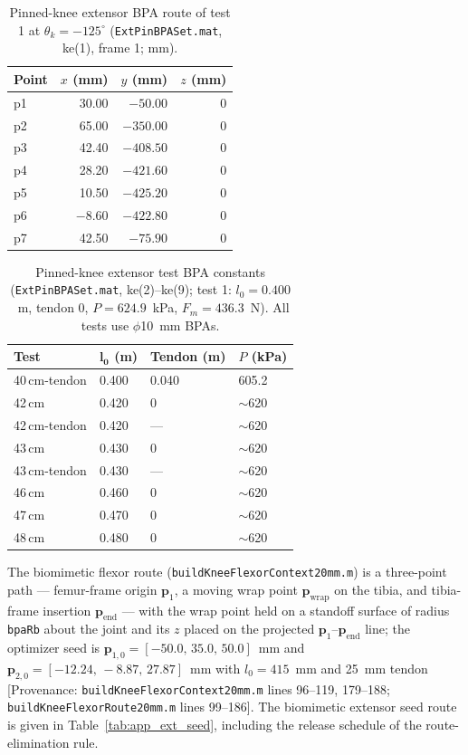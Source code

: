 \begin{table}[htbp]
\caption{Pinned-knee extensor BPA route of test 1 at $\theta_{k}=-125^{\circ}$ (\texttt{ExtPinBPASet.mat}, ke(1), frame 1; mm).}
\label{tab:app_extpin_route}
\begin{tabular}{@{}lrrr@{}}
\toprule
\textbf{Point} & $x$ (mm) & $y$ (mm) & $z$ (mm) \\
\midrule
p1 & 30.00  & $-50.00$ & 0 \\
p2 & 65.00  & $-350.00$ & 0 \\
p3 & 42.40  & $-408.50$ & 0 \\
p4 & 28.20  & $-421.60$ & 0 \\
p5 & 10.50  & $-425.20$ & 0 \\
p6 & $-8.60$ & $-422.80$ & 0 \\
p7 & 42.50  & $-75.90$ & 0 \\
\bottomrule
\end{tabular}
\end{table}

\begin{table}[htbp]
\caption{Pinned-knee extensor test BPA constants (\texttt{ExtPinBPASet.mat}, ke(2)--ke(9); test 1: $l_0 = 0.400$~m, tendon 0, $P = 624.9$~kPa, $F_m = 436.3$~N). All tests use $\phi$\qty{10}{\mm} BPAs.}
\label{tab:app_extpin_tests}
\begin{tabular}{@{}llll@{}}
\toprule
\textbf{Test} & $\boldsymbol{l_{0}}$ (m) & Tendon (m) & $P$ (kPa) \\
\midrule
40\,cm-tendon & 0.400 & 0.040 & 605.2 \\
42\,cm        & 0.420 & 0     & $\sim$620 \\
42\,cm-tendon & 0.420 & —     & $\sim$620 \\
43\,cm        & 0.430 & 0     & $\sim$620 \\
43\,cm-tendon & 0.430 & —     & $\sim$620 \\
46\,cm        & 0.460 & 0     & $\sim$620 \\
47\,cm        & 0.470 & 0     & $\sim$620 \\
48\,cm        & 0.480 & 0     & $\sim$620 \\
\bottomrule
\end{tabular}
\end{table}

The biomimetic flexor route (\texttt{buildKneeFlexorContext20mm.m}) is a three-point path --- femur-frame origin $\mathbf{p}_{1}$, a moving wrap point $\mathbf{p}_{\text{wrap}}$ on the tibia, and tibia-frame insertion $\mathbf{p}_{\text{end}}$ --- with the wrap point held on a standoff surface of radius \texttt{bpaRb} about the joint and its $z$ placed on the projected $\mathbf{p}_{1}$--$\mathbf{p}_{\text{end}}$ line; the optimizer seed is $\mathbf{p}_{1,0} = [-50.0,\,35.0,\,50.0]$~mm and $\mathbf{p}_{2,0} = [-12.24,\,-8.87,\,27.87]$~mm with $l_{0} = 415$~mm and 25~mm tendon [Provenance: \texttt{buildKneeFlexorContext20mm.m} lines 96--119, 179--188; \texttt{buildKneeFlexorRoute20mm.m} lines 99--186]. The biomimetic extensor seed route is given in Table~\ref{tab:app_ext_seed}, including the release schedule of the route-elimination rule.

